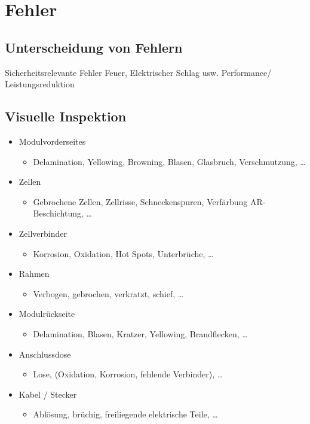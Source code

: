 
\section{Fehler}
\subsection{Unterscheidung von Fehlern}
\begin{outline}
    \1 Sicherheitsrelevante Fehler
    \2 Feuer, Elektrischer Schlag usw.
    \1 Performance/ Leistungsreduktion
\end{outline}
\subsection{Visuelle Inspektion}

\begin{itemize}
    \item Modulvorderseites
    \begin{itemize}
      \item Delamination, Yellowing, Browning, Blasen, Glasbruch, Verschmutzung, \ldots
    \end{itemize}
    
    \item Zellen
    \begin{itemize}
      \item Gebrochene Zellen, Zellrisse, Schneckenspuren, Verfärbung AR-Beschichtung, \ldots
    \end{itemize}
    
    \item Zellverbinder
    \begin{itemize}
      \item Korrosion, Oxidation, Hot Spots, Unterbrüche, \ldots
    \end{itemize}
    
    \item Rahmen
    \begin{itemize}
      \item Verbogen, gebrochen, verkratzt, schief, \ldots
    \end{itemize}
    
    \item Modulrückseite
    \begin{itemize}
      \item Delamination, Blasen, Kratzer, Yellowing, Brandflecken, \ldots
    \end{itemize}
    
    \item Anschlussdose
    \begin{itemize}
      \item Lose, (Oxidation, Korrosion, fehlende Verbinder), \ldots
    \end{itemize}
    
    \item Kabel / Stecker
    \begin{itemize}
      \item Ablösung, brüchig, freiliegende elektrische Teile, \ldots
    \end{itemize}
  \end{itemize}
  

